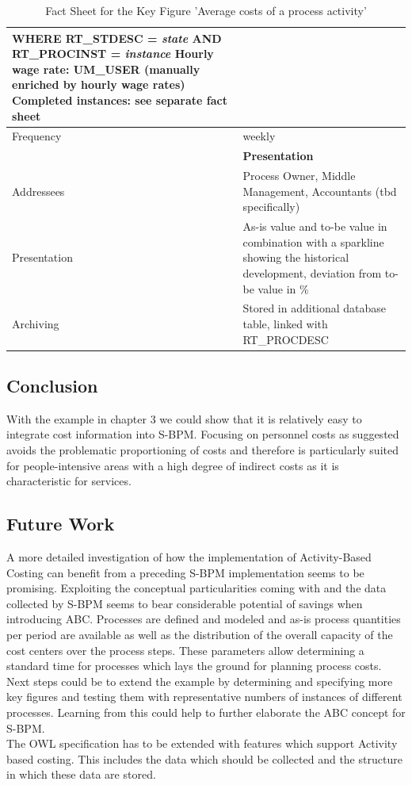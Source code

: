 \begin{table}[htbp]
\begin{tabular}{|p{3.0 cm } |p{10.0 cm }|}
		\hspace*{4mm}\textbf{WHERE} RT\_STDESC = \textit{state} \newline
		\hspace*{4mm}\textbf{AND} RT\_PROCINST = \textit{instance} \newline
		Hourly wage rate: UM\_USER (manually enriched by hourly wage rates) \newline
		Completed instances: see separate fact sheet\\
		\hline
		Frequency & weekly\\
		\hline
		\hline
		& \textbf{Presentation} \\
		\hline
		Addressees & Process Owner, Middle Management, Accountants (tbd specifically)\\
		\hline
		Presentation & As-is value and to-be value in combination with a sparkline showing the historical development, deviation from to-be value in \%\\
		\hline
		Archiving & Stored in additional database table, linked with RT\_PROCDESC\\
		\hline
	\end{tabular}
\label{tab:FactSgeet}
\caption{Fact Sheet for the Key Figure 'Average costs of a process activity'}
\end{table}

\subsection{Conclusion}
With the example in chapter 3 we could show that it is relatively easy to integrate cost information into S-BPM. Focusing on personnel costs as suggested avoids the problematic proportioning of costs and therefore is particularly suited for people-intensive areas with a high degree of indirect costs as it is characteristic for services.


\subsection{ Future Work}
A more detailed investigation of how the implementation of Activity-Based Costing can benefit from a preceding S-BPM implementation seems to be promising. Exploiting the conceptual particularities coming with and the data collected by S-BPM seems to bear considerable potential of savings when introducing ABC. Processes are defined and modeled and as-is process quantities per period are available as well as the distribution of the overall capacity of the cost centers over the process steps. These parameters allow determining a standard time for processes which lays the ground for planning process costs.
Next steps could be to extend the example by determining and specifying more key figures and testing them with representative numbers of instances of different processes. Learning from this could help to further elaborate the ABC concept for S-BPM.\\
The OWL specification has to be extended with features which support Activity based costing. This includes the data which should be collected and the structure in which these data are stored.
